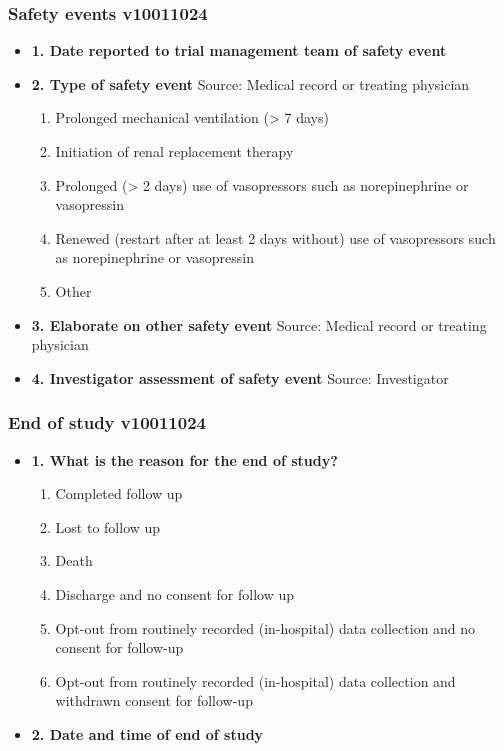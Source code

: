 \documentclass[
]{scrartcl}
\providecommand{\tightlist}{%
  \setlength{\itemsep}{0pt}\setlength{\parskip}{0pt}}\usepackage{longtable,booktabs,array}
\begin{document}
\hypertarget{safety-events-v10011024}{%
\subsubsection{Safety events v10011024}\label{safety-events-v10011024}}

\begin{itemize}
\item
  \textbf{1. Date reported to trial management team of safety event}
\item
  \textbf{2. Type of safety event} Source: Medical record or treating
  physician

  \begin{enumerate}
  \def\labelenumi{\arabic{enumi}.}
  \tightlist
  \item
    Prolonged mechanical ventilation (\textgreater{} 7 days)
  \item
    Initiation of renal replacement therapy
  \item
    Prolonged (\textgreater{} 2 days) use of vasopressors such as
    norepinephrine or vasopressin
  \item
    Renewed (restart after at least 2 days without) use of vasopressors
    such as norepinephrine or vasopressin
  \item
    Other
  \end{enumerate}
\item
  \textbf{3. Elaborate on other safety event} Source: Medical record or
  treating physician
\item
  \textbf{4. Investigator assessment of safety event} Source:
  Investigator
\end{itemize}

\hypertarget{end-of-study-v10011024}{%
\subsubsection{End of study v10011024}\label{end-of-study-v10011024}}

\begin{itemize}
\tightlist
\item
  \textbf{1. What is the reason for the end of study?}

  \begin{enumerate}
  \def\labelenumi{\arabic{enumi}.}
  \tightlist
  \item
    Completed follow up
  \item
    Lost to follow up
  \item
    Death
  \item
    Discharge and no consent for follow up
  \item
    Opt-out from routinely recorded (in-hospital) data collection and no
    consent for follow-up
  \item
    Opt-out from routinely recorded (in-hospital) data collection and
    withdrawn consent for follow-up
  \end{enumerate}
\item
  \textbf{2. Date and time of end of study}
\end{itemize}
\end{document}
